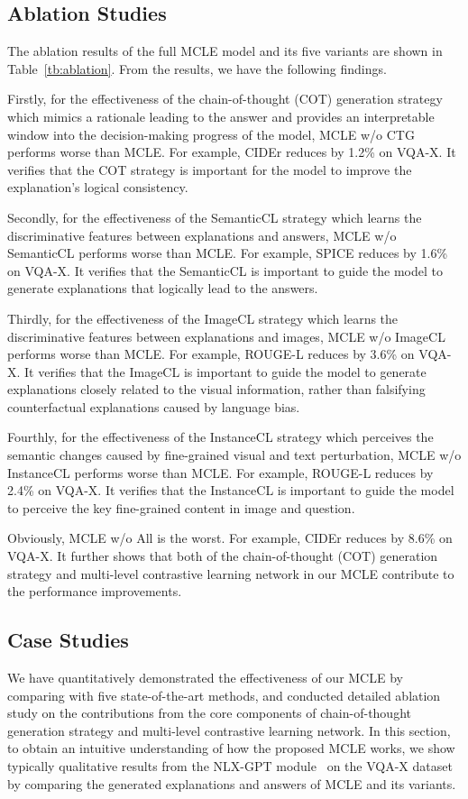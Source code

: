 \documentclass[letterpaper]{article} %
\begin{document}
\subsection{Ablation Studies}
The ablation results of the full MCLE model and its five variants are shown in Table~\ref{tb:ablation}. From the results, we have the following findings.

Firstly, for the effectiveness of the chain-of-thought (COT) generation strategy which mimics a rationale leading to the answer and provides an interpretable window into the decision-making progress of the model, MCLE w/o CTG performs worse than MCLE. For example, CIDEr reduces by 1.2\% on VQA-X. It verifies that the COT strategy is important for the model to improve the explanation's logical consistency.

Secondly, for the effectiveness of the SemanticCL strategy which learns the discriminative features between explanations and answers, MCLE w/o SemanticCL performs worse than MCLE. For example, SPICE reduces by 1.6\% on VQA-X. It verifies that the SemanticCL is important to guide the model to generate explanations that logically lead to the answers.

Thirdly, for the effectiveness of the ImageCL strategy which learns the discriminative features between explanations and images, MCLE w/o ImageCL performs worse than MCLE. For example, ROUGE-L reduces by 3.6\% on VQA-X. It verifies that the ImageCL is important to guide the model to generate explanations closely related to the visual information, rather than falsifying counterfactual explanations caused by language bias.

Fourthly, for the effectiveness of the InstanceCL strategy which perceives the semantic changes caused by fine-grained visual and text perturbation, MCLE w/o InstanceCL performs worse than MCLE. For example, ROUGE-L reduces by 2.4\% on VQA-X. It verifies that the InstanceCL is important to guide the model to perceive the key fine-grained content in image and question.

Obviously, MCLE w/o All is the worst. For example, CIDEr reduces by 8.6\% on VQA-X. It further shows that both of the chain-of-thought (COT) generation strategy and multi-level contrastive learning network in our MCLE contribute to the performance improvements.


\subsection{Case Studies}
We have quantitatively demonstrated the effectiveness of our MCLE by comparing with five state-of-the-art methods, and conducted detailed ablation study on the contributions from the core components of chain-of-thought generation strategy and multi-level contrastive learning network. In this section, to obtain an intuitive understanding of how the proposed MCLE works, we show typically qualitative results from the NLX-GPT module~\cite{sammani2022nlx} on the VQA-X dataset by comparing the generated explanations and answers of MCLE and its variants.
\end{document}
